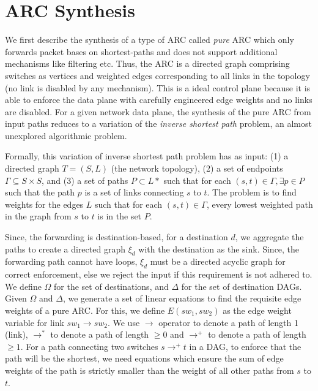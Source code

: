\section{ARC Synthesis} \label{sec:synthesis}
We first describe the synthesis of a type of ARC 
called {\em pure} ARC which
only forwards packet bases on shortest-paths and does 
not support additional mechanisms like filtering etc. 
Thus, 
the ARC is a directed graph comprising switches as 
vertices and weighted edges corresponding to all links in the
topology (no link is disabled by any mechanism). 
This is 
a ideal control plane because it is able to enforce the data plane
with carefully engineered edge weights and no links are disabled. 
For a given network data plane, the synthesis of 
the pure ARC from input paths reduces to a
variation of the {\em inverse shortest path} problem, an almost 
unexplored algorithmic problem. 

Formally, this variation of inverse shortest path problem 
has as input: (1) a directed graph $T = (S, L)$ (the network topology), 
(2) a set of endpoints $\Gamma \subseteq S\times S$, and 
(3) a set of paths $P \subset L*$
such that for each $(s,t) \in \Gamma, \exists p \in P$ such
that the path $p$ is a set of links connecting $s$ to $t$. 
The problem is to find weights for the edges $L$ such that 
for each $(s,t) \in \Gamma$, every lowest weighted path 
in the graph 
from $s$ to $t$ is in the set $P$. 

Since, the forwarding is destination-based,
for a destination $d$, we aggregate the paths 
to create a directed graph $\xi_d$ with the destination
as the sink. Since, the forwarding path cannot have 
loops, $\xi_d$ must be a directed acyclic graph for 
correct enforcement, else we reject the input if this
requirement is not adhered to.
We define $\Omega$ for the 
set of destinations, and $\Delta$ for  
the set of destination DAGs. 
Given $\Omega$ and $\Delta$, we generate a set of linear equations
to find the requisite edge weights of a pure ARC. 
For this, we define $E(sw_1, sw_2)$ as
the edge weight variable for link $sw_1 \rightarrow sw_2$. 
We use $\rightarrow$ operator to denote a path of length 1 
(link), $\rightarrow^*$ to denote a path of length $\geq 0$
and $\rightarrow^+$ to denote a path of length $\geq 1$.
For a path connecting two switches 
$s \rightarrow^+ t$ in a DAG, 
to enforce that the path will be the shortest, we need equations
which ensure the sum of edge weights of the path is strictly smaller than
the weight of all other paths from $s$ to $t$. 

